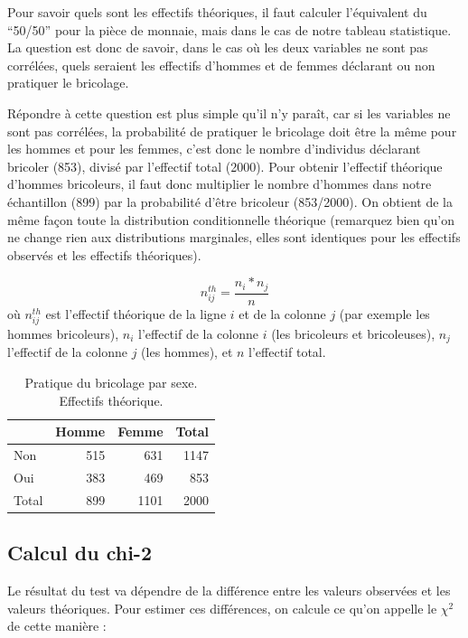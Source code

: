 \documentclass[
  french,
]{book}
\begin{document}
Pour savoir quels sont les effectifs théoriques, il faut calculer l'équivalent du ``50/50'' pour la pièce de monnaie, mais dans le cas de notre tableau statistique. La question est donc de savoir, dans le cas où les deux variables ne sont pas corrélées, quels seraient les effectifs d'hommes et de femmes déclarant ou non pratiquer le bricolage.

Répondre à cette question est plus simple qu'il n'y paraît, car si les variables ne sont pas corrélées, la probabilité de pratiquer le bricolage doit être la même pour les hommes et pour les femmes, c'est donc le nombre d'individus déclarant bricoler (853), divisé par l'effectif total (2000). Pour obtenir l'effectif théorique d'hommes bricoleurs, il faut donc multiplier le nombre d'hommes dans notre échantillon (899) par la probabilité d'être bricoleur (853/2000). On obtient de la même façon toute la distribution conditionnelle théorique (remarquez bien qu'on ne change rien aux distributions marginales, elles sont identiques pour les effectifs observés et les effectifs théoriques).

\[ n^{th}_{ij} = \frac{n_i * n_j}{n}\]
où \(n^{th}_{ij}\) est l'effectif théorique de la ligne \(i\) et de la colonne \(j\) (par exemple les hommes bricoleurs), \(n_i\) l'effectif de la colonne \(i\) (les bricoleurs et bricoleuses), \(n_j\) l'effectif de la colonne \(j\) (les hommes), et \(n\) l'effectif total.

\begin{table}

\caption{\label{tab:unnamed-chunk-24}Pratique du bricolage par sexe. Effectifs théorique.}
\centering
\begin{tabular}[t]{l|r|r|r}
\hline
  & Homme & Femme & Total\\
\hline
Non & 515 & 631 & 1147\\
\hline
Oui & 383 & 469 & 853\\
\hline
Total & 899 & 1101 & 2000\\
\hline
\end{tabular}
\end{table}

\hypertarget{calcul-du-chi-2}{%
\subsection{Calcul du chi-2}\label{calcul-du-chi-2}}

Le résultat du test va dépendre de la différence entre les valeurs observées et les valeurs théoriques. Pour estimer ces différences, on calcule ce qu'on appelle le \(\chi^2\) de cette manière :
\end{document}
